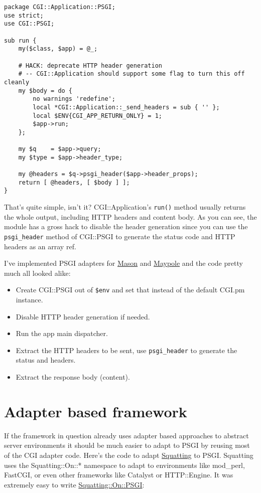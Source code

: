 \begin{lstlisting}
package CGI::Application::PSGI;
use strict;
use CGI::PSGI;

sub run {
    my($class, $app) = @_;

    # HACK: deprecate HTTP header generation
    # -- CGI::Application should support some flag to turn this off cleanly
    my $body = do {
        no warnings 'redefine';
        local *CGI::Application::_send_headers = sub { '' };
        local $ENV{CGI_APP_RETURN_ONLY} = 1;
        $app->run;
    };

    my $q    = $app->query;
    my $type = $app->header_type;

    my @headers = $q->psgi_header($app->header_props);
    return [ @headers, [ $body ] ];
}
\end{lstlisting}

That's quite simple, isn't it? CGI::Application's \lstinline!run()!
method usually returns the whole output, including HTTP headers and
content body. As you can see, the module has a gross hack to disable the
header generation since you can use the \lstinline!psgi_header! method
of CGI::PSGI to generate the status code and HTTP headers as an array
ref.

I've implemented PSGI adapters for
\href{http://search.cpan.org/perldoc?HTML::Mason}{Mason} and
\href{http://search.cpan.org/perldoc?Maypole}{Maypole} and the code
pretty much all looked alike:

\begin{itemize}
\itemsep1pt\parskip0pt
\item
  Create CGI::PSGI out of \lstinline!$env! and set that instead of the
  default CGI.pm instance.
\item
  Disable HTTP header generation if needed.
\item
  Run the app main dispatcher.
\item
  Extract the HTTP headers to be sent, use \lstinline!psgi_header! to
  generate the status and headers.
\item
  Extract the response body (content).
\end{itemize}

\section{Adapter based framework}\label{adapter-based-framework}

If the framework in question already uses adapter based approaches to
abstract server environments it should be much easier to adapt to PSGI
by reusing most of the CGI adapter code. Here's the code to adapt
\href{http://search.cpan.org/perldoc?Squatting}{Squatting} to PSGI.
Squatting uses the Squatting::On::* namespace to adapt to environments
like mod\_perl, FastCGI, or even other frameworks like Catalyst or
HTTP::Engine. It was extremely easy to write
\href{http://search.cpan.org/perldoc?Squatting::On::PSGI}{Squatting::On::PSGI}:

